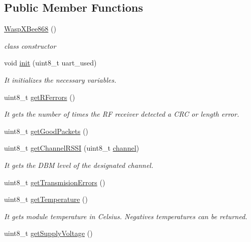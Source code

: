 \subsection*{Public Member Functions}
\begin{DoxyCompactItemize}
\item 
\hyperlink{class_wasp_x_bee868_abb8d2fda711175925eab272b7b6d5a81}{Wasp\+X\+Bee868} ()
\begin{DoxyCompactList}\small\item\em class constructor \end{DoxyCompactList}\item 
void \hyperlink{class_wasp_x_bee868_aabf171dc0222792c44b6d4e64027ed34}{init} (uint8\+\_\+t uart\+\_\+used)
\begin{DoxyCompactList}\small\item\em It initializes the necessary variables. \end{DoxyCompactList}\item 
uint8\+\_\+t \hyperlink{class_wasp_x_bee868_a79c402afa0fc990bd6bd92700949234b}{get\+R\+Ferrors} ()
\begin{DoxyCompactList}\small\item\em It gets the number of times the RF receiver detected a C\+RC or length error. \end{DoxyCompactList}\item 
uint8\+\_\+t \hyperlink{class_wasp_x_bee868_abb34e322ded25d1d43462ae4e04c8291}{get\+Good\+Packets} ()
\item 
uint8\+\_\+t \hyperlink{class_wasp_x_bee868_a0c5fdab7b361b5327d898301a251f789}{get\+Channel\+R\+S\+SI} (uint8\+\_\+t \hyperlink{class_wasp_x_bee_core_a28592573f397375b74148799137d1d6d}{channel})
\begin{DoxyCompactList}\small\item\em It gets the D\+BM level of the designated channel. \end{DoxyCompactList}\item 
uint8\+\_\+t \hyperlink{class_wasp_x_bee868_a2a0254849f668e11de3f054878566285}{get\+Transmision\+Errors} ()
\item 
uint8\+\_\+t \hyperlink{class_wasp_x_bee868_a24953a88b44307f06c1a8e7bea3c3d72}{get\+Temperature} ()
\begin{DoxyCompactList}\small\item\em It gets module temperature in Celsius. Negatives temperatures can be returned. \end{DoxyCompactList}\item 
uint8\+\_\+t \hyperlink{class_wasp_x_bee868_ab6b765e29458cc1949ffab7ea68a1694}{get\+Supply\+Voltage} ()

\end{DoxyCompactItemize}
